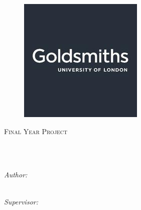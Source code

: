 \documentclass[
11pt, %
oneside, %
english, %
singlespacing, %
headsepline, %
]{Report} %
\author{Marcell \textsc{Batta}} %
\begin{document}
\frontmatter %

\pagestyle{plain} %


\begin{titlepage}
\begin{center}

\vspace*{.06\textheight}
\begin{figure}
\centering
\includegraphics{Figures/logo}
\end{figure}


\textsc{\Large Final Year Project}\\[0.5cm] %

\HRule \\[0.4cm] %
{\huge \bfseries \ttitle\par}\vspace{0.4cm} %
\HRule \\[1.5cm] %
 
\begin{minipage}[t]{0.4\textwidth}
\begin{flushleft} \large
\emph{Author:}\\
\authorname\\

\end{flushleft}
\end{minipage}
\begin{minipage}[t]{0.4\textwidth}
\begin{flushright} \large
\emph{Supervisor:} \\
\supname\\
\end{flushright}
\end{minipage}\\[3cm]
 

\end{center}
\end{titlepage}
\end{document}
